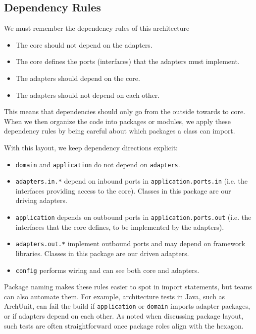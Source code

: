 \subsection{Dependency Rules}
\label{sec:hexagonal_dependency_rules}

We must remember the dependency rules of this architecture
\begin{itemize}
    \item The core should not depend on the adapters.
    \item The core defines the ports (interfaces) that the adapters must implement.
    \item The adapters should depend on the core.
    \item The adapters should not depend on each other.
\end{itemize}

This means that dependencies should only go from the outside towards to core. 
When we then organize the code into packages or modules, we apply these dependency rules by being careful about which packages a class can import.

With this layout, we keep dependency directions explicit:
\begin{itemize}
    \item \texttt{domain} and \texttt{application} do not depend on \texttt{adapters}.
    \item \texttt{adapters.in.*} depend on inbound ports in \texttt{application.ports.in} (i.e. the interfaces providing access to the core). Classes in this package are our driving adapters.
    \item \texttt{application} depends on outbound ports in \texttt{application.ports.out} (i.e. the interfaces that the core defines, to be implemented by the adapters).
    \item \texttt{adapters.out.*} implement outbound ports and may depend on framework libraries. Classes in this package are our driven adapters.
    \item \texttt{config} performs wiring and can see both core and adapters.
\end{itemize}

Package naming makes these rules easier to spot in import statements, but teams can also automate them. For example, architecture tests in Java, such as ArchUnit, can fail the build if \texttt{application} or \texttt{domain} imports adapter packages, or if adapters depend on each other. As noted when discussing package layout, such tests are often straightforward once package roles align with the hexagon.


